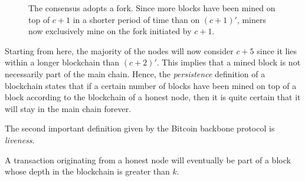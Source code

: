         \begin{figure}[ht]
          \centering
          \caption{The consensus adopts a fork. Since more blocks have been mined on top of \(c+1\) in a shorter period of time than on \((c+1)'\), miners now exclusively mine on the fork initiated by \(c+1\).}
          \label{figure:acceptedfork}
        \end{figure}
        
        Starting from here, the majority of the nodes will now consider \(c+5\) since it lies within a longer blockchain than \((c+2)'\). This implies that a mined block is not necessarily part of the main chain. Hence, the \textit{persistence} definition of a blockchain states that if a certain number of blocks have been mined on top of a block according to the blockchain of a honest node, then it is quite certain that it will stay in the main chain forever.
        
        The second important definition given by the Bitcoin backbone protocol is \textit{liveness}.
        
        \begin{Definition}
            A transaction originating from a honest node will eventually be part of a block whose depth in the blockchain is greater than \(k\).
        \end{Definition}

